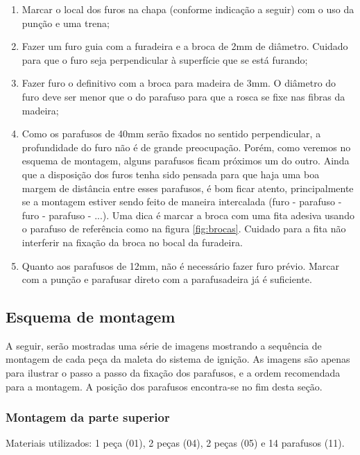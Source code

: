 \begin{enumerate}
    \item Marcar o local dos furos na chapa (conforme indicação a seguir) com o uso da punção e uma trena;
    \item Fazer um furo guia com a furadeira e a broca de 2mm de diâmetro. Cuidado para que o furo seja perpendicular à superfície que se está furando;
    \item Fazer furo o definitivo com a broca para madeira de 3mm. O diâmetro do furo deve ser menor que o do parafuso para que a rosca se fixe nas fibras da madeira;
    \item Como os parafusos de 40mm serão fixados no sentido perpendicular, a profundidade do furo não é de grande preocupação. Porém, como veremos no esquema de montagem, alguns parafusos ficam próximos um do outro. Ainda que a disposição dos furos tenha sido pensada para que haja uma boa margem de distância entre esses parafusos, é bom ficar atento, principalmente se a montagem estiver sendo feito de maneira intercalada (furo - parafuso - furo - parafuso - ...). Uma dica é marcar a broca com uma fita adesiva usando o parafuso de referência como na figura \ref{fig:brocas}. Cuidado para a fita não interferir na fixação da broca no bocal da furadeira.
    \item Quanto aos parafusos de 12mm, não é necessário fazer furo prévio. Marcar com a punção e parafusar direto com a parafusadeira já é suficiente.
\end{enumerate}


\subsection{Esquema de montagem}

A seguir, serão mostradas uma série de imagens mostrando a sequência de montagem de cada peça da maleta do sistema de ignição. As imagens são apenas para ilustrar o passo a passo da fixação dos parafusos, e a ordem recomendada para a montagem. A posição dos parafusos encontra-se no fim desta seção.

\subsubsection{Montagem da parte superior}

Materiais utilizados: 1 peça (01), 2 peças (04), 2 peças (05) e 14 parafusos (11).


